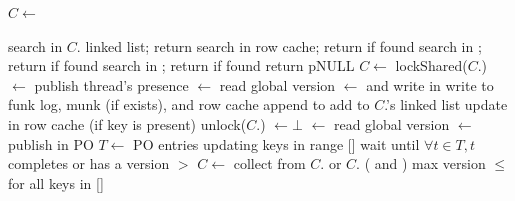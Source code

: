 \begin{algorithm}[tb]
\begin{algorithmic}[1]{}
		\State $C \leftarrow$ 




			\State search  in $C$. linked list;  return 
		\EndIf
		\State search  in row cache; return  if found
			\State	search  in ; return  if found
		\EndIf
		\State	search  in ; return  if found
		\State return pNULL	
\EndProcedure
\Statex
{}	
		\State $C \leftarrow$ 
		\State lockShared($C$.)
		\State  {}  $\leftarrow$ 
			 \Comment publish  thread's presence 
		\State {} $\leftarrow$    \Comment read global version
		\State  {}  $\leftarrow$ 
			\Comment and write in 
		\Statex \Comment write  to funk log, munk (if exists), and row cache  
		\State append  to 
			\State add   to $C$.'s linked list
		\EndIf
		\State update  in row cache (if key is present)
		\State unlock($C$.)
		\State {}  $\leftarrow \bot$ 
\EndProcedure
\Statex
{}
		\State {} $\leftarrow$    \Comment read global version
		\State  {}  $\leftarrow$ 
		\Comment publish in PO
		\State  $T \leftarrow $  PO entries updating keys in range [] 
		\State wait until $\forall t \in T, t$  completes or has a version $>$   
		\State $C \leftarrow$ 
		\Repeat
				\State collect from $C$. or $C$. ( and )
				\Statex \hspace{1cm} max version $\le$ for all keys in [] 


\end{algorithmic}
\end{algorithm}

